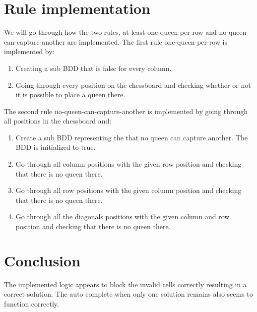 \section{Rule implementation}
We will go through how the two rules, at-least-one-queen-per-row and no-queen-can-capture-another are implemented. 
The first rule one-queen-per-row is implemented by:
\begin{enumerate}
 \item Creating a sub BDD that is false for every column.
 \item Going through every position on the chessboard and checking whether or not it is possible to place a queen there.
\end{enumerate}

The second rule no-queen-can-capture-another is implemented by going through all positions in the chessboard and:
\begin{enumerate}
	\item Create a sub BDD representing the that no queen can capture another. The BDD is initialized to true.
 	\item Go through all column positions with the given row position and checking that there is no queen there.
 	\item Go through all row positions with the given column position and checking that there is no queen there.
 	\item Go through all the diagonals positions with the given column and row position and checking that there is no queen there.
\end{enumerate}

\section{Conclusion}
The implemented logic appears to block the invalid cells correctly resulting in a correct solution. The auto complete when only one solution remains also seems to function correctly.